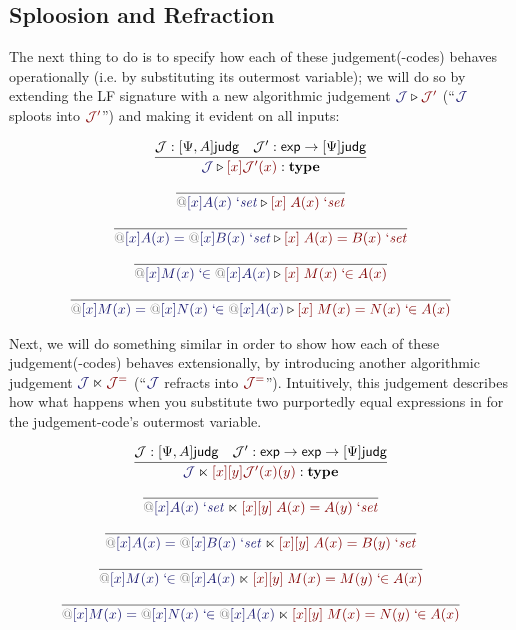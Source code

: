 \documentclass[acmtoplas]{acmtrans2m}
\makeatletter
\def\InputModeColorName{MidnightBlue}
\def\OutputModeColorName{Maroon}
\newcommand\InputMode[1]{{\color{\InputModeColorName}{#1}}}
\newcommand\OutputMode[1]{{\color{\OutputModeColorName}{#1}}}
\newcommand\type{\mathbf{type}}
\newcommand\sortexp{\mathsf{exp}}
\newcommand\sortj{\mathsf{judg}}
\newcommand\sortoj[1]{[#1]\sortj}
\newcommand\bind[2]{{\color{Gray}@}[#1]#2}
\newcommand\qisset[1]{#1\;`\mathit{set}}
\newcommand\qeqset[2]{#1=#2\;`\mathit{set}}
\newcommand\qmem[2]{#1\;`\!\!\in#2}
\newcommand\qeqmem[3]{#1=#2\;`\!\!\in#3}
\newcommand\sploot[2]{\InputMode{#1}\triangleright\OutputMode{#2}}
\newcommand\refract[2]{\InputMode{#1}\ltimes\OutputMode{#2}}
\makeatother
\begin{document}
\subsection{Sploosion and Refraction}

The next thing to do is to specify how each of these judgement(-codes) behaves
operationally (i.e. by substituting its outermost variable); we will do so by
extending the LF signature with a new algorithmic judgement
$\sploot{\mathcal{J}}{\mathcal{J}'}$ (``$\InputMode{\mathcal{J}}$ sploots into
$\OutputMode{\mathcal{J}'}$'') and making it evident on all inputs:

\begin{gather*}
  \infer{
    \sploot{\mathcal{J}}{[x]\mathcal{J}'(x)}:\type
  }{
    \mathcal{J}:\sortoj{\Psi,A} &
    \mathcal{J}': \sortexp\to\sortoj\Psi
  }\\[6pt]
  \infer{
    \sploot{
      \qisset{\bind{x}{A(x)}}
    }{
      [x]\; \qisset{A(x)}
    }
  }{
  }\\[6pt]
  \infer{
    \sploot{
      \qeqset{\bind{x}{A(x)}}{\bind{x}{B(x)}}
    }{
      [x]\; \qeqset{A(x)}{B(x)}
    }
  }{
  }\\[6pt]
  \infer{
    \sploot{
      \qmem{\bind{x}{M(x)}}{\bind{x}{A(x)}}
    }{
      [x]\; \qmem{M(x)}{A(x)}
    }
  }{
  }\\[6pt]
  \infer{
    \sploot{
      \qeqmem{\bind{x}{M(x)}}{\bind{x}{N(x)}}{\bind{x}{A(x)}}
    }{
      [x]\; \qeqmem{M(x)}{N(x)}{A(x)}
    }
  }{
  }
\end{gather*}

Next, we will do something similar in order to show how each of these
judgement(-codes) behaves extensionally, by introducing another algorithmic
judgement $\refract{\mathcal{J}}{\mathcal{J}^=}$ (``$\InputMode{\mathcal{J}}$
refracts into $\OutputMode{\mathcal{J}^=}$''). Intuitively, this judgement
describes how what happens when you substitute two purportedly equal
expressions in for the judgement-code's outermost variable.

\begin{gather*}
  \infer{
    \refract{\mathcal{J}}{[x][y]\mathcal{J}'(x)(y)}:\type
  }{
    \mathcal{J}:\sortoj{\Psi,A} &
    \mathcal{J}': \sortexp\to\sortexp\to\sortoj\Psi
  }\\[6pt]
  \infer{
    \refract{
      \qisset{\bind{x}{A(x)}}
    }{
      [x][y]\; \qeqset{A(x)}{A(y)}
    }
  }{
  }\\[6pt]
  \infer{
    \refract{
      \qeqset{\bind{x}{A(x)}}{\bind{x}{B(x)}}
    }{
      [x][y]\; \qeqset{A(x)}{B(y)}
    }
  }{
  }\\[6pt]
  \infer{
    \refract{
      \qmem{\bind{x}{M(x)}}{\bind{x}{A(x)}}
    }{
      [x][y]\; \qeqmem{M(x)}{M(y)}{A(x)}
    }
  }{
  }\\[6pt]
  \infer{
    \refract{
      \qeqmem{\bind{x}{M(x)}}{\bind{x}{N(x)}}{\bind{x}{A(x)}}
    }{
      [x][y]\; \qeqmem{M(x)}{N(y)}{A(x)}
    }
  }{
  }
\end{gather*}
\end{document}
